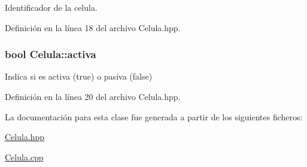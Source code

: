 Identificador de la celula. 



Definición en la línea 18 del archivo Celula.\-hpp.

\hypertarget{class_celula_a22ec0fe5fde605b5b3067acde093a3f7}{
\subsubsection[{activa}]{\setlength{\rightskip}{0pt plus 5cm}bool Celula\-::activa\hspace{0.3cm}{\ttfamily [private]}}}\label{class_celula_a22ec0fe5fde605b5b3067acde093a3f7}


Indica si es activa (true) o pasiva (false) 



Definición en la línea 20 del archivo Celula.\-hpp.



La documentación para esta clase fue generada a partir de los siguientes ficheros\-:\begin{DoxyCompactItemize}
\item 
\hyperlink{_celula_8hpp}{Celula.\-hpp}\item 
\hyperlink{_celula_8cpp}{Celula.\-cpp}\end{DoxyCompactItemize}

